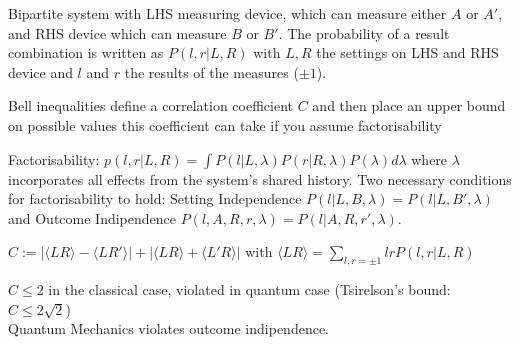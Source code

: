 \begin{squishlist}
    \item Bipartite system with LHS measuring device, which can measure either $A$ or $A'$, and RHS device which can measure $B$ or $B'$.
    The probability of a result combination is written as $P(l,r|L,R)$ with $L,R$ the settings on LHS and RHS device and $l$ and $r$ the results of the measures ($\pm 1$).
    \item Bell inequalities define a correlation coefficient $C$ and then place an upper bound on possible values this coefficient can take if you assume factorisability
    \item {Factorisability}: $p(l,r|L,R) = \int P(l|L,\lambda) P(r|R,\lambda) P(\lambda) d\lambda$ where $\lambda$ incorporates all effects from the system's shared history.
    Two necessary conditions for factorisability to hold: Setting Independence $P(l|L,B,\lambda) = P(l|L,B',\lambda)$ and Outcome Indipendence $P(l,A,R,r,\lambda) = P(l|A,R,r',\lambda)$.
    \item $C:= |\langle LR \rangle - \langle LR'\rangle  | + |\langle LR\rangle + \langle L'R \rangle |$ with $\langle LR \rangle = \sum_{l,r=\pm 1}lr P(l,r|L,R)$
    \item $C \leq 2$ in the classical case, violated in quantum case (Tsirelson's bound: $C \leq 2\sqrt{2}$) \\ Quantum Mechanics violates outcome indipendence.
\end{squishlist}


